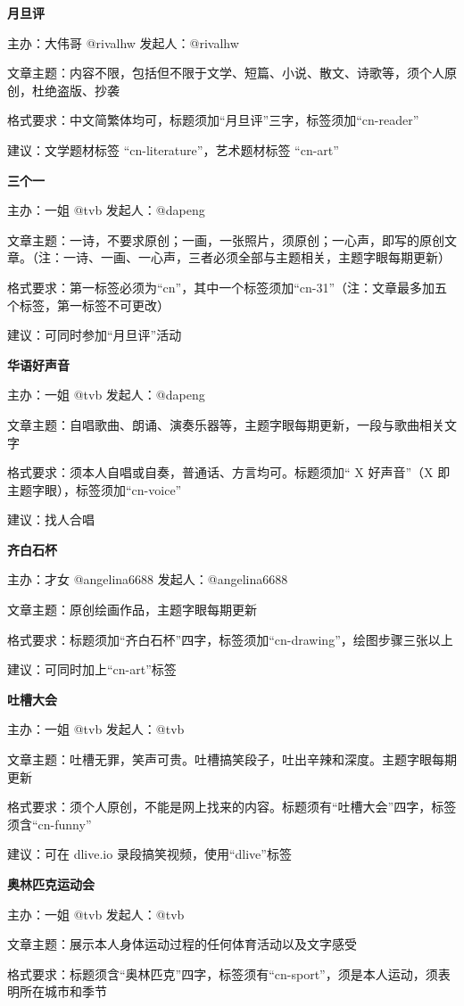 \documentclass[]{ctexbook}
\begin{document}
\textbf{月旦评}

主办：大伟哥 @rivalhw 发起人：@rivalhw

文章主题：内容不限，包括但不限于文学、短篇、小说、散文、诗歌等，须个人原创，杜绝盗版、抄袭

格式要求：中文简繁体均可，标题须加``月旦评''三字，标签须加``cn-reader''

建议：文学题材标签 ``cn-literature''，艺术题材标签 ``cn-art''

\textbf{三个一}

主办：一姐 @tvb 发起人：@dapeng

文章主题：一诗，不要求原创；一画，一张照片，须原创；一心声，即写的原创文章。（注：一诗、一画、一心声，三者必须全部与主题相关，主题字眼每期更新）

格式要求：第一标签必须为``cn''，其中一个标签须加``cn-31''（注：文章最多加五个标签，第一标签不可更改）

建议：可同时参加``月旦评''活动

\textbf{华语好声音}

主办：一姐 @tvb 发起人：@dapeng

文章主题：自唱歌曲、朗诵、演奏乐器等，主题字眼每期更新，一段与歌曲相关文字

格式要求：须本人自唱或自奏，普通话、方言均可。标题须加`` X 好声音''（X 即主题字眼），标签须加``cn-voice''

建议：找人合唱

\textbf{齐白石杯}

主办：才女 @angelina6688 发起人：@angelina6688

文章主题：原创绘画作品，主题字眼每期更新

格式要求：标题须加``齐白石杯''四字，标签须加``cn-drawing''，绘图步骤三张以上

建议：可同时加上``cn-art''标签

\textbf{吐槽大会}

主办：一姐 @tvb 发起人：@tvb

文章主题：吐槽无罪，笑声可贵。吐槽搞笑段子，吐出辛辣和深度。主题字眼每期更新

格式要求：须个人原创，不能是网上找来的内容。标题须有``吐槽大会''四字，标签须含``cn-funny''

建议：可在 dlive.io 录段搞笑视频，使用``dlive''标签

\textbf{奥林匹克运动会}

主办：一姐 @tvb 发起人：@tvb

文章主题：展示本人身体运动过程的任何体育活动以及文字感受

格式要求：标题须含``奥林匹克''四字，标签须有``cn-sport''，须是本人运动，须表明所在城市和季节
\end{document}
